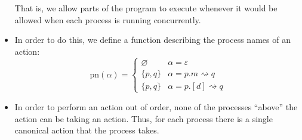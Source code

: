 \documentclass{lecturenotes}
\renewcommand{\tt}{\textsf{true}\xspace}
\newcommand{\ff}{\textsf{false}\xspace}
\newcommand{\sendrecv}[4]{\ensuremath{#1.#2 \rightsquigarrow #3.#4}}
\newcommand{\syncmsg}[3]{\ensuremath{#1.[#2] \rightsquigarrow #3}}
\newcommand{\chorif}[4]{\ensuremath{\textsf{if}~#1.#2 \mathrel{\textsf{then}} #3 \mathrel{\textsf{else}} #4}}
\newcommand{\sendrecva}[3]{\ensuremath{#1.#2 \rightsquigarrow #3}}
\newcommand{\syncmsga}[3]{\ensuremath{#1.[#2] \rightsquigarrow #3}}
\begin{document}
\begin{itemize}
  That is, we allow parts of the program to execute whenever it would be allowed when each process is running concurrently.
\item In order to do this, we define a function describing the process names of an action:
  $$
  \text{pn}(\alpha) = \left\{\begin{array}{ll} \varnothing & \alpha = \varepsilon\\ \{p, q\} & \alpha = \sendrecva{p}{m}{q}\\ \{p, q\} & \alpha = \syncmsga{p}{d}{q}\end{array}\right.
  $$
\item In order to perform an action out of order, none of the processes ``above'' the action can be taking an action.
  Thus, for each process there is a single canonical action that the process takes.
\end{itemize}

\end{document}
